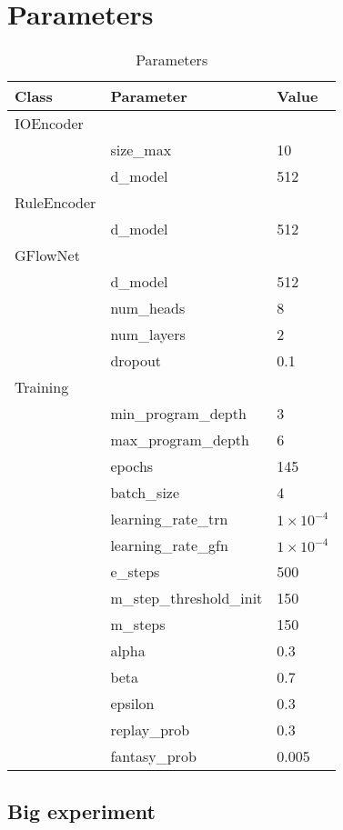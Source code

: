 \clearpage
\section{Parameters}
\begin{table}[h!]
    \centering
    \begin{tabularx}{\textwidth}{|l|l|X|}
    \hline
    \textbf{Class} & \textbf{Parameter} & \textbf{Value} \\
    \hline
    IOEncoder &  &  \\
     & size\_max & 10 \\
     & d\_model & 512 \\
    \hline
    RuleEncoder & & \\
     & d\_model & 512 \\
    \hline
    GFlowNet &  & \\
     & d\_model & 512 \\
     & num\_heads & 8 \\
     & num\_layers & 2 \\
     & dropout & 0.1 \\
    \hline
    Training & & \\
     & min\_program\_depth & 3 \\
     & max\_program\_depth & 6 \\
     & epochs & 145 \\
     & batch\_size & 4 \\
     & learning\_rate\_trn & $1 \times 10^{-4}$ \\
     & learning\_rate\_gfn & $1 \times 10^{-4}$ \\
     & e\_steps & 500 \\
     & m\_step\_threshold\_init & 150 \\
     & m\_steps & 150 \\
     & alpha & 0.3 \\
     & beta & 0.7 \\
     & epsilon & 0.3 \\
     & replay\_prob & 0.3 \\
     & fantasy\_prob & 0.005 \\

    \hline
    \end{tabularx}
    \caption{Parameters}
    \label{table:params}
    \end{table}


    \subsection{Big experiment}

